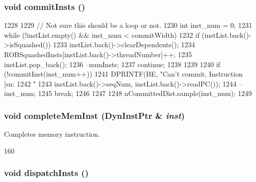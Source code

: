 \hypertarget{classLWBackEnd_ac8b85fbfdf330d000c094a9d1886d264}{
\subsubsection[{commitInsts}]{\setlength{\rightskip}{0pt plus 5cm}void commitInsts ()}}
\label{classLWBackEnd_ac8b85fbfdf330d000c094a9d1886d264}



\begin{DoxyCode}
1228 {
1229     // Not sure this should be a loop or not.
1230     int inst_num = 0;
1231     while (!instList.empty() && inst_num < commitWidth) {
1232         if (instList.back()->isSquashed()) {
1233             instList.back()->clearDependents();
1234             ROBSquashedInsts[instList.back()->threadNumber]++;
1235             instList.pop_back();
1236             --numInsts;
1237             continue;
1238         }
1239 
1240         if (!commitInst(inst_num++)) {
1241             DPRINTF(BE, "Can't commit, Instruction [sn:%
1242                     "%
1243                     instList.back()->seqNum, instList.back()->readPC());
1244             --inst_num;
1245             break;
1246         }
1247     }
1248     nCommittedDist.sample(inst_num);
1249 }
\end{DoxyCode}
\hypertarget{classLWBackEnd_a2212f511dc1886c073cf7ff1665f5c87}{
\subsubsection[{completeMemInst}]{\setlength{\rightskip}{0pt plus 5cm}void completeMemInst ({\bf DynInstPtr} \& {\em inst})}}
\label{classLWBackEnd_a2212f511dc1886c073cf7ff1665f5c87}
Completes memory instruction. 


\begin{DoxyCode}
160 { }
\end{DoxyCode}
\hypertarget{classLWBackEnd_ac3f94deccc87588d728716efc4dd7ce8}{
\subsubsection[{dispatchInsts}]{\setlength{\rightskip}{0pt plus 5cm}void dispatchInsts ()}}
\label{classLWBackEnd_ac3f94deccc87588d728716efc4dd7ce8}



